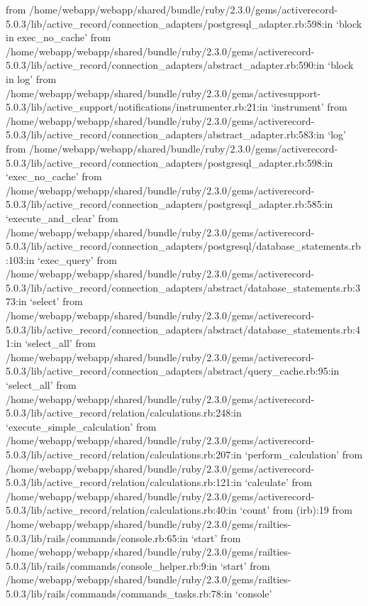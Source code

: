         from /home/webapp/webapp/shared/bundle/ruby/2.3.0/gems/activerecord-5.0.3/lib/active_record/connection_adapters/postgresql_adapter.rb:598:in `block in exec_no_cache'
        from /home/webapp/webapp/shared/bundle/ruby/2.3.0/gems/activerecord-5.0.3/lib/active_record/connection_adapters/abstract_adapter.rb:590:in `block in log'
        from /home/webapp/webapp/shared/bundle/ruby/2.3.0/gems/activesupport-5.0.3/lib/active_support/notifications/instrumenter.rb:21:in `instrument'
        from /home/webapp/webapp/shared/bundle/ruby/2.3.0/gems/activerecord-5.0.3/lib/active_record/connection_adapters/abstract_adapter.rb:583:in `log'
        from /home/webapp/webapp/shared/bundle/ruby/2.3.0/gems/activerecord-5.0.3/lib/active_record/connection_adapters/postgresql_adapter.rb:598:in `exec_no_cache'
        from /home/webapp/webapp/shared/bundle/ruby/2.3.0/gems/activerecord-5.0.3/lib/active_record/connection_adapters/postgresql_adapter.rb:585:in `execute_and_clear'
        from /home/webapp/webapp/shared/bundle/ruby/2.3.0/gems/activerecord-5.0.3/lib/active_record/connection_adapters/postgresql/database_statements.rb:103:in `exec_query'
        from /home/webapp/webapp/shared/bundle/ruby/2.3.0/gems/activerecord-5.0.3/lib/active_record/connection_adapters/abstract/database_statements.rb:373:in `select'
        from /home/webapp/webapp/shared/bundle/ruby/2.3.0/gems/activerecord-5.0.3/lib/active_record/connection_adapters/abstract/database_statements.rb:41:in `select_all'
        from /home/webapp/webapp/shared/bundle/ruby/2.3.0/gems/activerecord-5.0.3/lib/active_record/connection_adapters/abstract/query_cache.rb:95:in `select_all'
        from /home/webapp/webapp/shared/bundle/ruby/2.3.0/gems/activerecord-5.0.3/lib/active_record/relation/calculations.rb:248:in `execute_simple_calculation'
        from /home/webapp/webapp/shared/bundle/ruby/2.3.0/gems/activerecord-5.0.3/lib/active_record/relation/calculations.rb:207:in `perform_calculation'
        from /home/webapp/webapp/shared/bundle/ruby/2.3.0/gems/activerecord-5.0.3/lib/active_record/relation/calculations.rb:121:in `calculate'
        from /home/webapp/webapp/shared/bundle/ruby/2.3.0/gems/activerecord-5.0.3/lib/active_record/relation/calculations.rb:40:in `count'
        from (irb):19
        from /home/webapp/webapp/shared/bundle/ruby/2.3.0/gems/railties-5.0.3/lib/rails/commands/console.rb:65:in `start'
        from /home/webapp/webapp/shared/bundle/ruby/2.3.0/gems/railties-5.0.3/lib/rails/commands/console_helper.rb:9:in `start'
        from /home/webapp/webapp/shared/bundle/ruby/2.3.0/gems/railties-5.0.3/lib/rails/commands/commands_tasks.rb:78:in `console'
